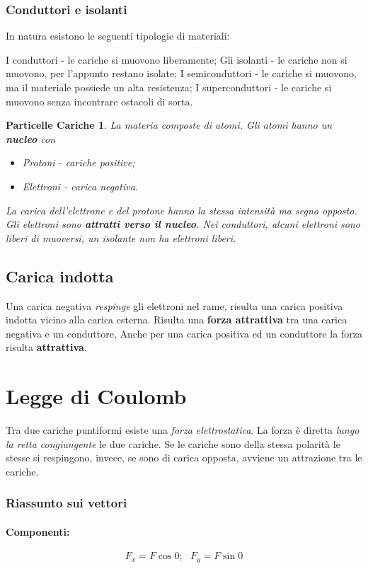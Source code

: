 \subsubsection{Conduttori e isolanti}
In natura esistono le seguenti tipologie di materiali:
\begin{tasks}{2}
	\task I conduttori - le cariche si muovono liberamente;
	\task Gli isolanti - le cariche non si muovono, per l'appunto restano
	isolate;
	\task I semiconduttori - le cariche si muovono, ma il materiale possiede un
	alta resistenza;
	\task I superconduttori - le cariche si muovono senza incontrare ostacoli
	di sorta.
\end{tasks}
\newtheorem{pcariche}{Particelle Cariche}
\begin{pcariche}
	La materia composte di atomi. Gli atomi hanno un \textbf{nucleo} con
	\begin{itemize}
		\item Protoni - cariche positive;
		\item Elettroni - carica negativa.
	\end{itemize}
	La carica dell'elettrone e del protone hanno la stessa intensità ma segno
	opposto. Gli elettroni sono \textbf{attratti verso il nucleo}. Nei
	conduttori, alcuni elettroni sono \textit{liberi di muoversi}, un isolante
	\textit{non ha elettroni liberi}.
\end{pcariche}
\subsection{Carica indotta}
Una carica negativa \textit{respinge} gli elettroni nel rame, risulta una
carica positiva indotta vicino alla carica esterna. Risulta una \textbf{forza
attrattiva} tra una carica negativa e un conduttore, Anche per una carica
positiva ed un conduttore la forza risulta \textbf{attrattiva}.
\section{Legge di Coulomb}
Tra due cariche puntiformi esiste una \textit{forza elettrostatica}. La forza è
diretta \textit{lungo la retta congiungente} le due cariche.
Se le cariche sono della stessa polarità le stesse si respingono, invece, se
sono di carica opposta, avviene un attrazione tra le cariche.
\subsubsection{Riassunto sui vettori}
\paragraph{Componenti:}
\begin{equation}
	F_x=F\cos 0;\text{ }F_y=F\sin 0
\end{equation}
